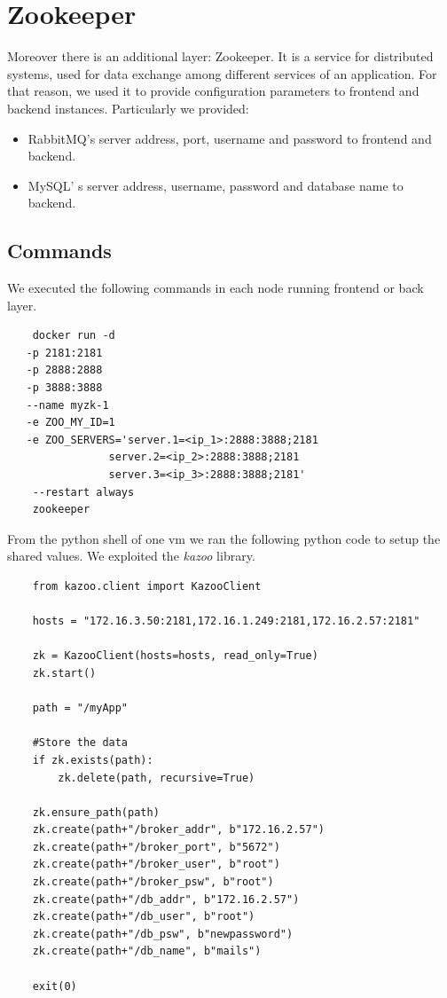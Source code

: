\documentclass{article}
\begin{document}
\section{Zookeeper}
Moreover there is an additional layer: Zookeeper. It is a service for distributed systems, used for data exchange among different services of an application. For that reason, we used it to provide configuration parameters to frontend and backend instances. Particularly we provided:
\begin{itemize}
\item RabbitMQ’s server address, port, username and password to frontend and backend.
\item MySQL’ s server address, username, password and database name to backend.
\end{itemize}
\subsection{Commands}
We executed the following commands in each node running frontend or back layer.
\begin{verbatim}
    docker run -d 
   -p 2181:2181 
   -p 2888:2888 
   -p 3888:3888 
   --name myzk-1 
   -e ZOO_MY_ID=1 
   -e ZOO_SERVERS='server.1=<ip_1>:2888:3888;2181 
                server.2=<ip_2>:2888:3888;2181 
                server.3=<ip_3>:2888:3888;2181' 
    --restart always 
    zookeeper
\end{verbatim}
From the python shell of one vm we ran the following python code to setup the shared values. We exploited the \textit{kazoo} library.
\begin{verbatim}
    from kazoo.client import KazooClient

    hosts = "172.16.3.50:2181,172.16.1.249:2181,172.16.2.57:2181"

    zk = KazooClient(hosts=hosts, read_only=True)
    zk.start()

    path = "/myApp"

    #Store the data
    if zk.exists(path):
        zk.delete(path, recursive=True)

    zk.ensure_path(path)
    zk.create(path+"/broker_addr", b"172.16.2.57") 
    zk.create(path+"/broker_port", b"5672")
    zk.create(path+"/broker_user", b"root")
    zk.create(path+"/broker_psw", b"root")
    zk.create(path+"/db_addr", b"172.16.2.57")
    zk.create(path+"/db_user", b"root")
    zk.create(path+"/db_psw", b"newpassword")
    zk.create(path+"/db_name", b"mails")

    exit(0)
\end{verbatim}
\end{document}
